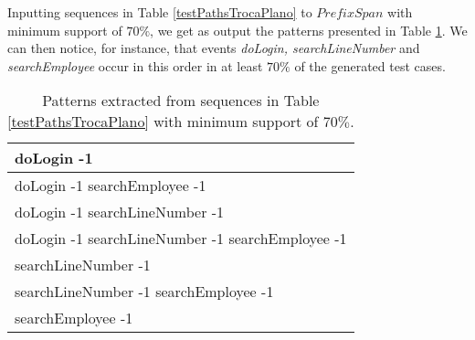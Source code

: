 Inputting sequences in Table \ref{testPathsTrocaPlano} to $PrefixSpan$ with minimum support of $70\%$, we get as output the patterns presented in Table \ref{patternsTrocaPlano}. We can then notice, for instance, that events \textit{doLogin, searchLineNumber} and \textit{searchEmployee} occur in this order in at least $70\%$ of the generated test cases.

\begin{table}[h]
\begin{center}
\begin{tabular}{|l|}

\hline

doLogin -1  \\ \hline
doLogin -1 searchEmployee -1 \\ \hline
doLogin -1 searchLineNumber -1  \\ \hline
doLogin -1 searchLineNumber -1 searchEmployee -1  \\ \hline
searchLineNumber -1  \\ \hline
searchLineNumber -1 searchEmployee -1  \\ \hline
searchEmployee -1 \\

\hline
\end{tabular}
\end{center}
\caption{Patterns extracted from sequences in Table \ref{testPathsTrocaPlano} with minimum support of $70\%$.}
\label{patternsTrocaPlano}
\end{table}

